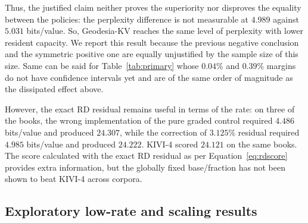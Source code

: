 \documentclass[10pt,twocolumn]{article}
\newcommand{\method}{Geodesia-KV}
\newcommand{\bpv}{bits/value}
\begin{document}
Thus, the justified claim neither proves the superiority nor disproves the
equality between the policies: the perplexity difference is not measurable at
$4.989$ against $5.031$ \bpv{}. So, \method{} reaches the same level of perplexity
with lower resident capacity. We report this result because the previous
negative conclusion and the symmetric positive one are equally unjustified by
the sample size of this size. Same can be said for Table~\ref{tab:primary}
whose $0.04\%$ and $0.39\%$ margins do not have confidence intervals yet and
are of the same order of magnitude as the dissipated effect above.

However, the exact RD residual remains useful in terms of the rate: on three
of the books, the wrong implementation of the pure graded control required
$4.486$ \bpv{} and produced $24.307$, while the correction of $3.125\%$
residual required $4.985$ \bpv{} and produced $24.222$. KIVI-4 scored
$24.121$ on the same books. The score calculated with the exact RD residual
as per Equation~\ref{eq:rdscore} provides extra information, but the globally fixed base/fraction has not been shown to beat KIVI-4 across corpora.

\subsection{Exploratory low-rate and scaling results}
\end{document}

